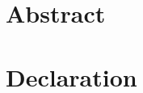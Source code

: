 \documentclass[11pt,twoside,openright,showframe]{report}
\begin{document}


\newpage  %
\setcounter{page}{2}

  \chapter*{Abstract} 
  \chapter*{Declaration} 
\hTOCandLists
\clearpage

\end{document}

